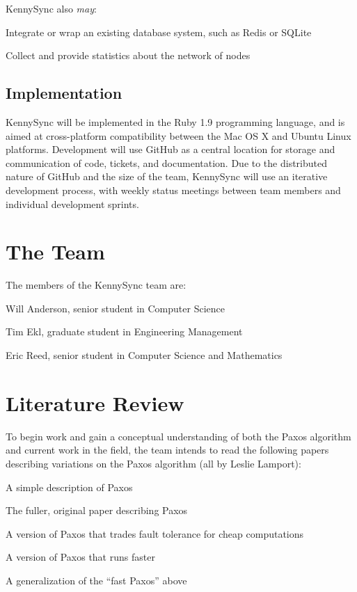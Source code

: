 \documentclass{article}
\begin{document}
KennySync also \textit{may}:

\begin{itemize*}
\item Integrate or wrap an existing database system, such as Redis or SQLite
\item Collect and provide statistics about the network of nodes
\end{itemize*}

\subsection{Implementation}

KennySync will be implemented in the Ruby 1.9 programming language, and is aimed at cross-platform compatibility between the Mac OS X and Ubuntu Linux platforms. Development will use GitHub as a central location for storage and communication of code, tickets, and documentation. Due to the distributed nature of GitHub and the size of the team, KennySync will use an iterative development process, with weekly status meetings between team members and individual development sprints.

\section{The Team}

The members of the KennySync team are:

\begin{itemize*}
\item Will Anderson, senior student in Computer Science
\item Tim Ekl, graduate student in Engineering Management
\item Eric Reed, senior student in Computer Science and Mathematics
\end{itemize*}

\section{Literature Review}

To begin work and gain a conceptual understanding of both the Paxos algorithm and current work in the field, the team intends to read the following papers describing variations on the Paxos algorithm (all by Leslie Lamport):

\begin{itemize*}
\item A simple description of Paxos \cite{simple-paxos}
\item The fuller, original paper describing Paxos \cite{paxos}
\item A version of Paxos that trades fault tolerance for cheap computations \cite{cheap-paxos}
\item A version of Paxos that runs faster \cite{fast-paxos}
\item A generalization of the ``fast Paxos'' above \cite{generalized-paxos}
\end{itemize*}



\end{document}
